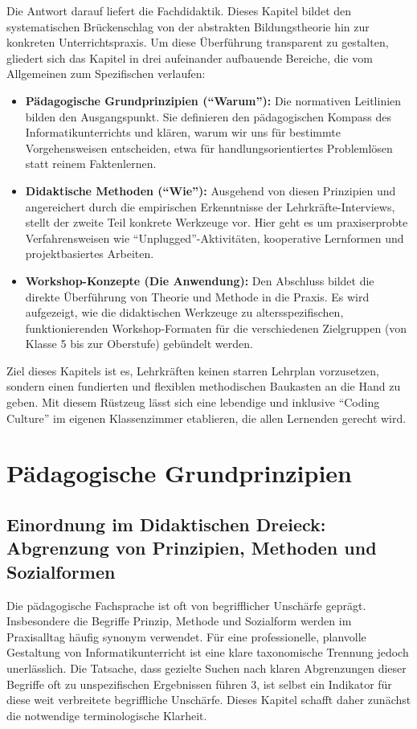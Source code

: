 \documentclass[a5paper,pagesize,10pt,bibtotoc,pointlessnumbers,
normalheadings,DIV=9,twoside=false]{scrbook}
\begin{document}
Die Antwort darauf liefert die Fachdidaktik. Dieses Kapitel bildet den systematischen Brückenschlag von der abstrakten Bildungstheorie hin zur konkreten Unterrichtspraxis. Um diese Überführung transparent zu gestalten, gliedert sich das Kapitel in drei aufeinander aufbauende Bereiche, die vom Allgemeinen zum Spezifischen verlaufen:

\begin{itemize}
    \item \textbf{Pädagogische Grundprinzipien (``Warum''):} Die normativen Leitlinien bilden den Ausgangspunkt. Sie definieren den pädagogischen Kompass des Informatikunterrichts und klären, warum wir uns für bestimmte Vorgehensweisen entscheiden, etwa für handlungsorientiertes Problemlösen statt reinem Faktenlernen.
    \item \textbf{Didaktische Methoden (``Wie''):} Ausgehend von diesen Prinzipien und angereichert durch die empirischen Erkenntnisse der Lehrkräfte-Interviews, stellt der zweite Teil konkrete Werkzeuge vor. Hier geht es um praxiserprobte Verfahrensweisen wie ``Unplugged''-Aktivitäten, kooperative Lernformen und projektbasiertes Arbeiten.
    \item \textbf{Workshop-Konzepte (Die Anwendung):} Den Abschluss bildet die direkte Überführung von Theorie und Methode in die Praxis. Es wird aufgezeigt, wie die didaktischen Werkzeuge zu altersspezifischen, funktionierenden Work\-shop-Formaten für die verschiedenen Zielgruppen (von Klasse 5 bis zur Oberstufe) gebündelt werden.
\end{itemize}

Ziel dieses Kapitels ist es, Lehrkräften keinen starren Lehrplan vorzusetzen, sondern einen fundierten und flexiblen methodischen Baukasten an die Hand zu geben. Mit diesem Rüstzeug lässt sich eine lebendige und inklusive ``Coding Culture'' im eigenen Klassenzimmer etablieren, die allen Lernenden gerecht wird.

\section*{Pädagogische Grundprinzipien}

\subsection*{Einordnung im Didaktischen Dreieck: Abgrenzung von Prinzipien, Methoden und Sozialformen}

Die pädagogische Fachsprache ist oft von begrifflicher Unschärfe geprägt. Insbesondere die Begriffe Prinzip, Methode und Sozialform werden im Praxisalltag häufig synonym verwendet. Für eine professionelle, planvolle Gestaltung von Informatikunterricht ist eine klare taxonomische Trennung jedoch unerlässlich. Die Tatsache, dass gezielte Suchen nach klaren Abgrenzungen dieser Begriffe oft zu unspezifischen Ergebnissen führen 3, ist selbst ein Indikator für diese weit verbreitete begriffliche Unschärfe. Dieses Kapitel schafft daher zunächst die notwendige terminologische Klarheit.
\end{document}
